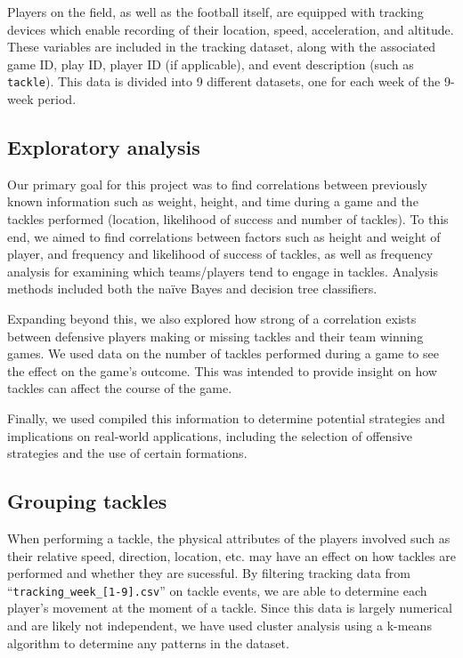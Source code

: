 \documentclass[bibtex, sigconf, hyperref={colorlinks=true,linkcolor=blue,urlcolor=blue}]{acmart}
\begin{document}
Players on the field, as well as the football itself, are equipped with
tracking devices which enable recording of their location, speed, acceleration,
and altitude. These variables are included in the tracking dataset, along with
the associated game ID, play ID, player ID (if applicable), and event
description (such as \verb|tackle|). This data is divided into 9 different datasets,
one for each week of the 9-week period.

\subsection{Exploratory analysis}

Our primary goal for this project was to find correlations between previously
known information such as weight, height, and time during a game and the
tackles performed (location, likelihood of success and number of tackles). To
this end, we aimed to find correlations between factors such as height and
weight of player, and frequency and likelihood of success of tackles, as well
as frequency analysis for examining which teams/players tend to engage in
tackles. Analysis methods included both the na\"ive Bayes and decision tree
classifiers.

Expanding beyond this, we also explored how strong of a correlation exists
between defensive players making or missing tackles and their team winning
games. We used data on the number of tackles performed during a game to see the
effect on the game's outcome. This was intended to provide insight on how
tackles can affect the course of the game.

Finally, we used compiled this information to determine potential strategies
and implications on real-world applications, including the selection of
offensive strategies and the use of certain formations.

\subsection{Grouping tackles}

When performing a tackle, the physical attributes of the players involved such
as their relative speed, direction, location, etc. may have an effect on how
tackles are performed and whether they are sucessful. By filtering tracking
data from ``\verb|tracking_week_[1-9].csv|'' on tackle events, we are able to
determine each player's movement at the moment of a tackle. Since this data is
largely numerical and are likely not independent, we have used cluster analysis
using a k-means algorithm to determine any patterns in the dataset.
\end{document}
